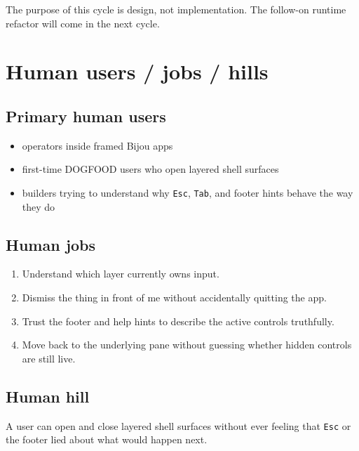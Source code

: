 The purpose of this cycle is design, not implementation. The follow-on runtime refactor will come in the next cycle.

\section{Human users / jobs / hills}\label{record-254-human-users-jobs-hills}

\subsection{Primary human users}\label{record-254-primary-human-users}

\begin{itemize}
\tightlist
\item
  operators inside framed Bijou apps
\item
  first-time DOGFOOD users who open layered shell surfaces
\item
  builders trying to understand why \texttt{E\allowbreak{}s\allowbreak{}c}, \texttt{T\allowbreak{}a\allowbreak{}b}, and footer hints behave the way they do
\end{itemize}

\subsection{Human jobs}\label{record-254-human-jobs}

\begin{enumerate}
\def\labelenumi{\arabic{enumi}.}
\tightlist
\item
  Understand which layer currently owns input.
\item
  Dismiss the thing in front of me without accidentally quitting the app.
\item
  Trust the footer and help hints to describe the active controls truthfully.
\item
  Move back to the underlying pane without guessing whether hidden controls are still live.
\end{enumerate}

\subsection{Human hill}\label{record-254-human-hill}

A user can open and close layered shell surfaces without ever feeling that \texttt{E\allowbreak{}s\allowbreak{}c} or the footer lied about what would happen next.

